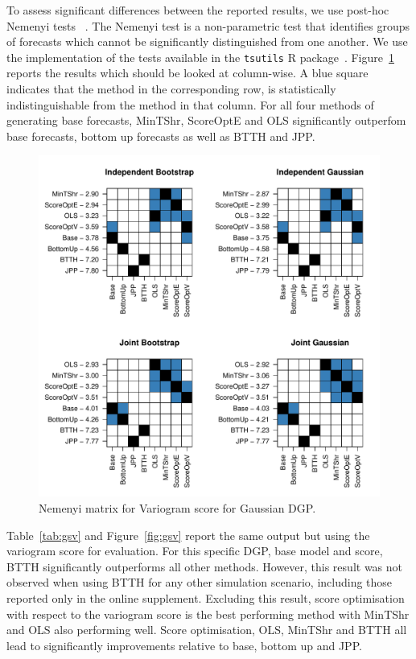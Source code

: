 \documentclass[12pt]{article}
\theoremstyle{definition}
\begin{document}
To assess significant differences between the reported results, we use post-hoc Nemenyi tests ~\citep{HolEtAl2013}. The Nemenyi test is a non-parametric test that identifies groups of forecasts which cannot be significantly distinguished from one another. We use the implementation of the tests available in the \verb|tsutils| R package~\citep{tsutilspackage}.  Figure~\ref{fig:gse} reports the results which should be looked at column-wise.  A blue square indicates that the method in the corresponding row, is statistically indistinguishable from the method in that column.  For all four methods of generating base forecasts, MinTShr, ScoreOptE and OLS significantly outperfom base forecasts, bottom up forecasts as well as BTTH and JPP.

\begin{figure}[H]
	\centering
	\includegraphics[width=.85\textwidth]{Figs/gse.pdf}
	\caption{Nemenyi matrix for Variogram score for Gaussian DGP.}
	\label{fig:gse}
\end{figure}

Table~\ref{tab:gsv} and Figure~\ref{fig:gsv} report the same output but using the variogram score for evaluation.  For this specific DGP, base model and score, BTTH significantly outperforms all other methods.  However, this result was not observed when using BTTH for any other simulation scenario, including those reported only in the online supplement.  Excluding this result, score optimisation with respect to the variogram score is the best performing method with MinTShr and OLS also performing well.  Score optimisation, OLS, MinTShr and BTTH all lead to significantly improvements relative to base, bottom up and JPP.
\end{document}
